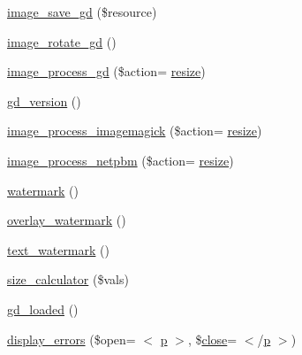 \begin{DoxyCompactItemize}
\item 
\hyperlink{class_c_i___image__lib_a802a33d51249d4d31d59cbc89fbc4dd5}{image\+\_\+save\+\_\+gd} (\$resource)
\item 
\hyperlink{class_c_i___image__lib_ae0d52ef7503342a0a1c56c99da140446}{image\+\_\+rotate\+\_\+gd} ()
\item 
\hyperlink{class_c_i___image__lib_a3744cd1438c26d74169260e3580c18c5}{image\+\_\+process\+\_\+gd} (\$action= \textquotesingle{}\hyperlink{class_c_i___image__lib_a94e38a7d478ce07200a52c51497e598e}{resize}\textquotesingle{})
\item 
\hyperlink{class_c_i___image__lib_a7d141f85d677d5e6db12020009569fde}{gd\+\_\+version} ()
\item 
\hyperlink{class_c_i___image__lib_ab92e23a2b66ec7e2a3ade452214ac3fd}{image\+\_\+process\+\_\+imagemagick} (\$action= \textquotesingle{}\hyperlink{class_c_i___image__lib_a94e38a7d478ce07200a52c51497e598e}{resize}\textquotesingle{})
\item 
\hyperlink{class_c_i___image__lib_a715b6f648450b393c843af9a8756f6d8}{image\+\_\+process\+\_\+netpbm} (\$action= \textquotesingle{}\hyperlink{class_c_i___image__lib_a94e38a7d478ce07200a52c51497e598e}{resize}\textquotesingle{})
\item 
\hyperlink{class_c_i___image__lib_a4732a76680e7c0b28f98f6634b567cc9}{watermark} ()
\item 
\hyperlink{class_c_i___image__lib_a7fa0fd0aabe26803d61d7e09c1cb73de}{overlay\+\_\+watermark} ()
\item 
\hyperlink{class_c_i___image__lib_afb7640b6150e16b00efac0511d9fa03d}{text\+\_\+watermark} ()
\item 
\hyperlink{class_c_i___image__lib_a827549db4de2281a8f2b35ada2ef3909}{size\+\_\+calculator} (\$vals)
\item 
\hyperlink{class_c_i___image__lib_a04376d5530f38a1a61f59c2d769284ba}{gd\+\_\+loaded} ()
\item 
\hyperlink{class_c_i___image__lib_a3ed4aa1a4d480c82bb1b663efd466aee}{display\+\_\+errors} (\$open= \textquotesingle{}$<$ \hyperlink{jquery-ui_8min_8js_ad1707b001240e9c8298830073364c8bf}{p} $>$\textquotesingle{}, \$\hyperlink{bootstrap_8min_8js_afaca3a961d693f40135a872e93e71198}{close}= \textquotesingle{}$<$/\hyperlink{jquery-ui_8min_8js_ad1707b001240e9c8298830073364c8bf}{p} $>$\textquotesingle{})
\end{DoxyCompactItemize}
